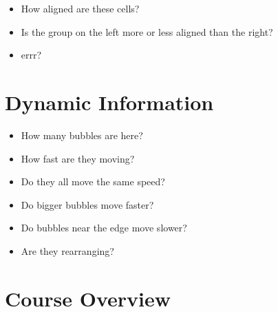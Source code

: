 \documentclass[letterpaper,10pt,english]{sphinxmanual}
\begin{document}
\sphinxAtStartPar
{}


\begin{itemize}
\item {} 
\sphinxAtStartPar
How aligned are these cells?

\item {} 
\sphinxAtStartPar
Is the group on the left more or less aligned than the right?

\item {} 
\sphinxAtStartPar
errr?

\end{itemize}


\section{Dynamic Information}
\label{\detokenize{01-Introduction:dynamic-information}}\begin{itemize}
\item {} 
\sphinxAtStartPar
How many bubbles are here?

\item {} 
\sphinxAtStartPar
How fast are they moving?

\item {} 
\sphinxAtStartPar
Do they all move the same speed?

\item {} 
\sphinxAtStartPar
Do bigger bubbles move faster?

\item {} 
\sphinxAtStartPar
Do bubbles near the edge move slower?

\item {} 
\sphinxAtStartPar
Are they rearranging?

\end{itemize}

\sphinxAtStartPar



\section{Course Overview}
\label{\detokenize{01-Introduction:course-overview}}
\end{document}
